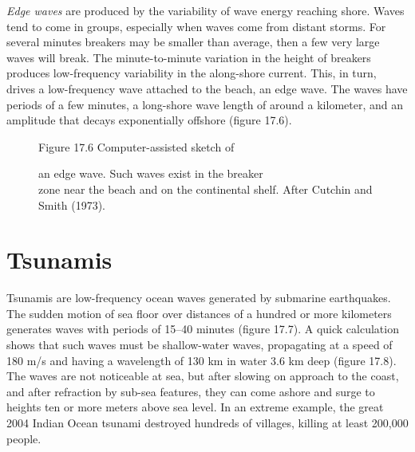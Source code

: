 \textit{Edge waves} are produced by the
variability of wave energy reaching shore. Waves tend to come in
groups, especially when waves come from distant storms. For several
minutes breakers may be smaller than
average, then a few very large waves will break. The minute-to-minute
variation in the height of breakers produces low-frequency variability
in the along-shore current. This, in turn, drives a low-frequency wave
attached to the beach, an edge wave. The waves have periods of a few
minutes, a long-shore wave length of around a kilometer, and an
amplitude that decays exponentially offshore (figure 17.6).

\begin{figure}[h!]
\vspace{-2ex}
\centering
\footnotesize
Figure 17.6 Computer-assisted sketch of \rule{0mm}{4ex}an edge
wave. Such waves exist in the breaker\\zone near the beach and on the
continental shelf. After Cutchin and Smith (1973).

\label{fig:edgewave}
\vspace{-4ex}
\end{figure}

\section{Tsunamis}
Tsunamis are low-frequency ocean waves
generated by submarine earthquakes. The sudden motion of sea floor
over distances of a hundred or more kilometers generates waves with
periods of 15--40 minutes (figure 17.7). A quick calculation shows
that such waves must be shallow-water waves, propagating at a speed of
180 m/s and having a wavelength of 130 km in water 3.6 km deep (figure
17.8). The waves are not noticeable at sea, but after slowing on
approach to the coast, and after refraction by sub-sea features, they
can come ashore and surge to heights ten or more meters above sea
level. In an extreme example, the great 2004 Indian Ocean
tsunami destroyed hundreds of villages,
killing at least 200,000 people.

